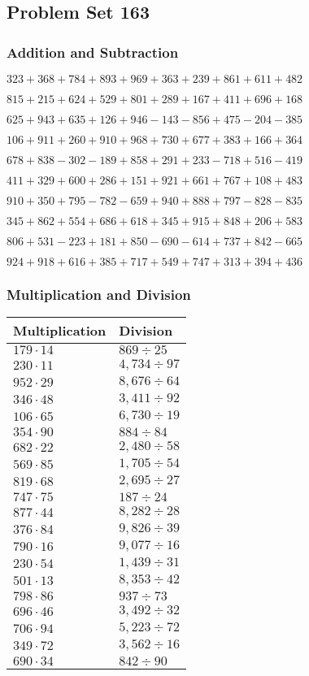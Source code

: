 \hypertarget{problem-set-163}{%
\subsection{Problem Set 163}\label{problem-set-163}}

\hypertarget{addition-and-subtraction}{%
\subsubsection{Addition and
Subtraction}\label{addition-and-subtraction}}

\(323 +368 +784 +893 +969 +363 +239 +861 +611 +482\)

\(815 +215 +624 +529 +801 +289 +167 +411 +696 +168\)

\(625 +943 +635 +126 +946 - 143 - 856 +475 - 204 - 385\)

\(106 +911 +260 +910 +968 +730 +677 +383 +166 +364\)

\(678 +838 - 302 - 189 +858 +291 +233 - 718 +516 - 419\)

\(411 +329 +600 +286 +151 +921 +661 +767 +108 +483\)

\(910 +350 +795 - 782 - 659 +940 +888 +797 - 828 - 835\)

\(345 +862 +554 +686 +618 +345 +915 +848 +206 +583\)

\(806 +531 - 223 +181 +850 - 690 - 614 +737 +842 - 665\)

\(924 +918 +616 +385 +717 +549 +747 +313 +394 +436\)

\hypertarget{multiplication-and-division}{%
\subsubsection{Multiplication and
Division}\label{multiplication-and-division}}

\begin{longtable}[]{@{}ll@{}}
\toprule
Multiplication & Division\tabularnewline
\midrule
\endhead
\(179 \cdot 14\) & \(869÷25\)\tabularnewline
\(230 \cdot 11\) & \(4,734÷97\)\tabularnewline
\(952 \cdot 29\) & \(8,676÷64\)\tabularnewline
\(346 \cdot 48\) & \(3,411÷92\)\tabularnewline
\(106 \cdot 65\) & \(6,730÷19\)\tabularnewline
\(354 \cdot 90\) & \(884÷84\)\tabularnewline
\(682 \cdot 22\) & \(2,480÷58\)\tabularnewline
\(569 \cdot 85\) & \(1,705÷54\)\tabularnewline
\(819 \cdot 68\) & \(2,695÷27\)\tabularnewline
\(747 \cdot 75\) & \(187÷24\)\tabularnewline
\(877 \cdot 44\) & \(8,282÷28\)\tabularnewline
\(376 \cdot 84\) & \(9,826÷39\)\tabularnewline
\(790 \cdot 16\) & \(9,077÷16\)\tabularnewline
\(230 \cdot 54\) & \(1,439÷31\)\tabularnewline
\(501 \cdot 13\) & \(8,353÷42\)\tabularnewline
\(798 \cdot 86\) & \(937÷73\)\tabularnewline
\(696 \cdot 46\) & \(3,492÷32\)\tabularnewline
\(706 \cdot 94\) & \(5,223÷72\)\tabularnewline
\(349 \cdot 72\) & \(3,562÷16\)\tabularnewline
\(690 \cdot 34\) & \(842÷90\)\tabularnewline
\bottomrule
\end{longtable}

